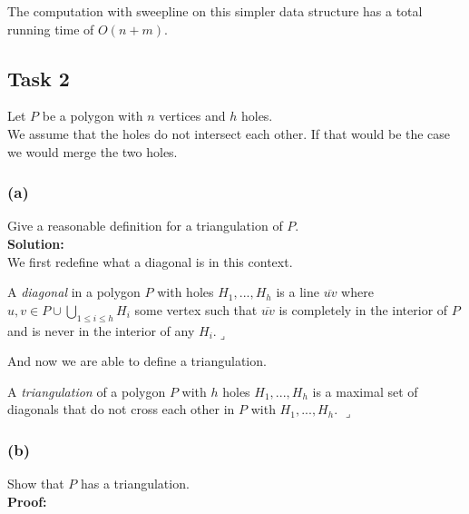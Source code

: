 \documentclass[11pt,a4paper,ngerman]{article}
\begin{document}
The computation with sweepline on this simpler data structure has a total running time of $O(n+m)$.

\subsection*{Task 2}
Let $P$ be a polygon with $n$ vertices and $h$ holes.\\

We assume that the holes do not intersect each other. If that would be the case we would merge the two holes.

\subsubsection*{(a)}
Give a reasonable definition for a triangulation of $P$.\\

\textbf{Solution:}\\


We first redefine what a diagonal is in this context.

\begin{def}\label{alge:ueb3:holes:def1}
    A \emph{diagonal} in a polygon $P$ with holes $H_1,...,H_h$ is a line $\overline{uv}$ where $u,v \in P \cup \bigcup_{1\leq i \leq h} H_i$
    some vertex such that $\overline{uv}$ is completely in the interior of $P$ and is never in the interior of any $H_i$.\mbox{}\hfill$\lrcorner$
\end{def}

And now we are able to define a triangulation.

\begin{def}\label{alge:ueb3:hole:def2}
    A \emph{triangulation} of a polygon $P$ with $h$ holes $H_1, ..., H_h$ is a maximal set of diagonals 
    that do not cross each other in $P$ with $H_1, ... ,H_h$.
    \mbox{}\hfill$\lrcorner$
\end{def}

\subsubsection*{(b)}
Show that $P$ has a triangulation.\\

\textbf{Proof:}\\
\end{document}
